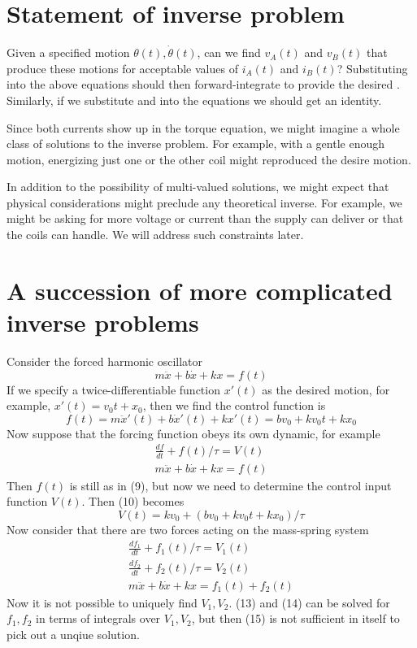 \documentclass{article}
\begin{document}
\begin{appendix}
\section{Statement of inverse problem}
Given a specified motion $\theta(t), \dot\theta(t)$,  can we find $v_A(t)$ and $v_B(t)$ that produce these motions for acceptable values of $i_A(t) $ and $i_B(t)$? Substituting \vsol into the above equations should then forward-integrate to provide the desired \thetasol. Similarly, if we substitute \thetasol and \vsol into the equations we should get an identity.

Since both currents show up in the torque equation, we might imagine a whole class of solutions to the inverse problem. For example, with a gentle enough motion, energizing just one or the other coil might reproduced the desire motion. 

In addition to the possibility of multi-valued solutions, we might expect that physical considerations might preclude any theoretical inverse. For example, we might be asking for more voltage or current than the supply can deliver or that the coils can handle. We will address such constraints later. 

\section{A succession of more complicated inverse problems}
Consider the forced harmonic oscillator
\begin{equation}
m \ddot x + b \dot x + k x = f(t)
\end{equation}
If we specify a twice-differentiable function $x'(t)$ as the desired motion, for example, $x'(t) = v_0 t + x_0$, then we find the control function is 
\begin{equation}
f(t) = m \ddot x'(t) + b \dot x'(t) + k x'(t) = b v_0 + k v_0 t + k x_0
\end{equation}
Now suppose that the forcing function obeys its own dynamic, for example
\begin{align}
\frac{df}{dt} + f(t) / \tau = V(t) \\
m \ddot x + b \dot x + k x = f(t) 
\end{align}
Then $f(t)$ is still as in (9), but now we need to determine the control input function $V(t)$. Then (10) becomes
\begin{equation}
V(t) = k v_0 + ( b v_0 + k v_0 t + k x_0)/\tau
\end{equation}
Now consider that there are two forces acting on the mass-spring system
\begin{align}
\frac{df_1}{dt} + f_1(t) / \tau = V_1(t)\\
\frac{df_2}{dt} + f_2(t) / \tau = V_2(t)\\
m \ddot x + b \dot x + k x = f_1(t) + f_2(t)
\end{align}
Now it is not possible to uniquely find $V_1, V_2$. (13) and (14) can be solved for $f_1, f_2$ in terms of integrals over $V_1, V_2$, but then (15) is not sufficient in itself to pick out a unqiue solution.


\end{appendix}
\end{document}
